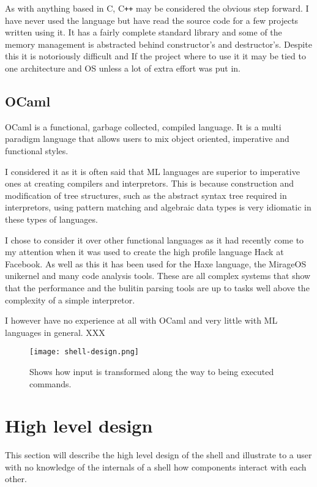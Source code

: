 As with anything based in C, C\verb!++! may be considered the obvious step forward.
I have never used the language but have read the source code for a few projects written using it.
It has a fairly complete standard library and some of the memory management is abstracted behind constructor's and destructor's.
Despite this it is notoriously difficult and If the project where to use it it may be tied to one architecture and OS unless a lot of extra effort was put in.

\subsection{OCaml}
OCaml is a functional, garbage collected, compiled language.
It is a multi paradigm language that allows users to mix object oriented, imperative and functional styles.

I considered it as it is often said that ML languages are superior to imperative ones at creating compilers and interpretors. 
This is because construction and modification of tree structures, such as the abstract syntax tree required in interpretors, using pattern matching and algebraic data types is very idiomatic in these types of languages.

I chose to consider it over other functional languages as it had recently come to my attention when it was used to create the high profile language Hack at Facebook.
As well as this it has been used for the Haxe language, the MirageOS unikernel and many code analysis tools.
These are all complex systems that show that the performance and the bulitin parsing tools are up to tasks well above the complexity of a simple interpretor.

I however have no experience at all with OCaml and very little with ML languages in general.
XXX


\begin{figure}[hp]
    \centering
    \texttt{[image: shell-design.png]}
    \caption[Shell execution pipeline]{Shows how input is transformed along the way to being executed commands.}
    \label{fig:shell-flowchart}
\end{figure}


\section{High level design}
This section will describe the high level design of the shell and illustrate to a user with no knowledge of the internals of a shell how components interact with each other.

